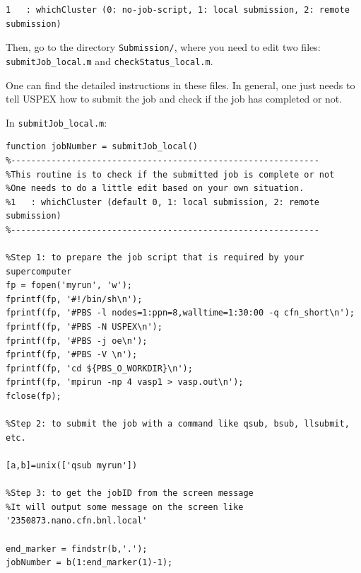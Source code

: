 \documentclass[12pt]{article}
\newcommand{\file}[1]{\texttt{#1}}
\begin{document}
{\footnotesize
\begin{verbatim}
1   : whichCluster (0: no-job-script, 1: local submission, 2: remote submission)
\end{verbatim}}

Then, go to the directory \file{Submission/}, where you need to edit two files:
\file{submitJob\_local.m} and \file{checkStatus\_local.m}.

One can find the detailed instructions in these files. In general, one just
needs to tell USPEX how to submit the job and check if the job has completed or
not.

\vspace{0.5cm}
In \file{submitJob\_local.m}:

\begin{lstlisting}
function jobNumber = submitJob_local()
%-------------------------------------------------------------
%This routine is to check if the submitted job is complete or not
%One needs to do a little edit based on your own situation.
%1   : whichCluster (default 0, 1: local submission, 2: remote submission)
%-------------------------------------------------------------

%Step 1: to prepare the job script that is required by your supercomputer
fp = fopen('myrun', 'w');    
fprintf(fp, '#!/bin/sh\n');
fprintf(fp, '#PBS -l nodes=1:ppn=8,walltime=1:30:00 -q cfn_short\n');
fprintf(fp, '#PBS -N USPEX\n');
fprintf(fp, '#PBS -j oe\n');
fprintf(fp, '#PBS -V \n');
fprintf(fp, 'cd ${PBS_O_WORKDIR}\n');
fprintf(fp, 'mpirun -np 4 vasp1 > vasp.out\n');
fclose(fp);

%Step 2: to submit the job with a command like qsub, bsub, llsubmit, etc.

[a,b]=unix(['qsub myrun'])

%Step 3: to get the jobID from the screen message
%It will output some message on the screen like '2350873.nano.cfn.bnl.local'

end_marker = findstr(b,'.');
jobNumber = b(1:end_marker(1)-1); 
\end{lstlisting}
\end{document}

